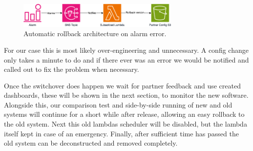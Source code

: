  \begin{figure}[H]
    \centering
    \includegraphics[width=8cm]{assets/rollback.drawio.png}
    \caption{Automatic rollback architecture on alarm error.}
    \label{fig:rollback}
  \end{figure}

  For our case this is most likely over-engineering and unnecessary. A config change only takes a minute to do and if there ever was an error we 
  would be notified and called out to fix the problem when necessary. 

  Once the switchover does happen we wait for partner feedback and use created dashboards, these will be shown in the next section, to monitor 
  the new software. Alongside this, our comparison test and side-by-side running of new and old systems will continue for a short while after release, 
  allowing an easy rollback to the old system. Next this old lambdas scheduler will be disabled, but the lambda itself kept in case of an emergency. 
  Finally, after sufficient time has passed the old system can be deconstructed and removed completely.

\newpage
